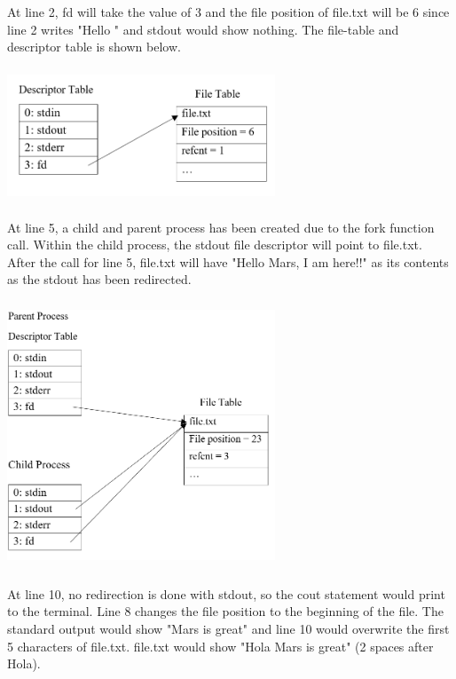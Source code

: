 \documentclass[12pt]{article}
\begin{document}
At line 2, fd will take the value of 3 and the file position of file.txt will be 6 since line 2 writes "Hello " and stdout would show nothing. The file-table and descriptor table is shown below. 

\begin{center}
\includegraphics[width=8cm, height=4cm]{P6Line2}
\end{center}

At line 5, a child and parent process has been created due to the fork function call. Within the child process, the stdout file descriptor will point to file.txt. After the call for line 5, file.txt will have "Hello Mars, I am here!!" as its contents as the stdout has been redirected. 

\begin{center}
\includegraphics[width=8cm, height=8cm]{P6Line5}
\end{center}

At line 10, no redirection is done with stdout, so the cout statement would print to the terminal. Line 8 changes the file position to the beginning of the file. The standard output would show "Mars is great" and line 10 would overwrite the first 5 characters of file.txt. file.txt would show "Hola  Mars is great" (2 spaces after Hola). 
\end{document}

